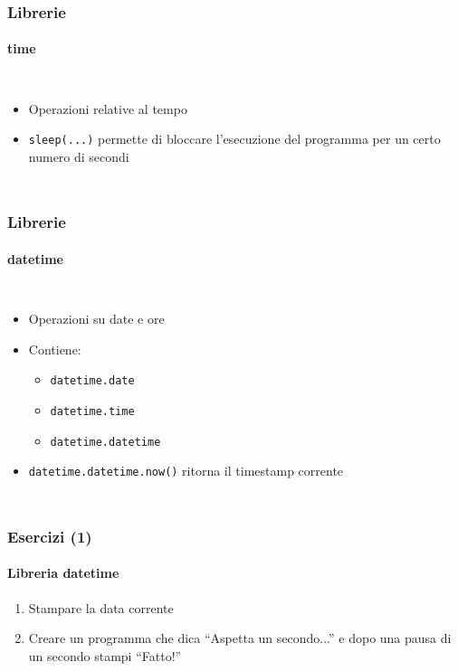 \begin{contentframe}
    \frametitle{Librerie}
    \framesubtitle{time}

    \begin{columns}
        \begin{itemize}
            \item Operazioni relative al tempo
            \bigskip
            \item \texttt{sleep(...)} permette di bloccare l'esecuzione del programma per un certo numero di secondi
        \end{itemize}
        
        \centering
    \end{columns}
\end{contentframe}

\begin{contentframe}
    \frametitle{Librerie}
    \framesubtitle{datetime}

    \begin{columns}
        \begin{itemize}
            \item Operazioni su date e ore
            \bigskip
            \item Contiene:
            \begin{itemize}
                \item \texttt{datetime.date}
                \item \texttt{datetime.time}
                \item \texttt{datetime.datetime}
            \end{itemize}
            \bigskip
            \item \texttt{datetime.datetime.now()} ritorna il timestamp corrente 
        \end{itemize}
        
        \centering
    \end{columns}
\end{contentframe}

\begin{exerciseframe}
    \frametitle{Esercizi (1)}
    \framesubtitle{Libreria datetime}

    \begin{enumerate}
        \item Stampare la data corrente
    
        \pause
        \bigskip
        \item Creare un programma che dica ``Aspetta un secondo...'' e dopo una pausa di un secondo stampi ``Fatto!''
    \end{enumerate}
\end{exerciseframe}

